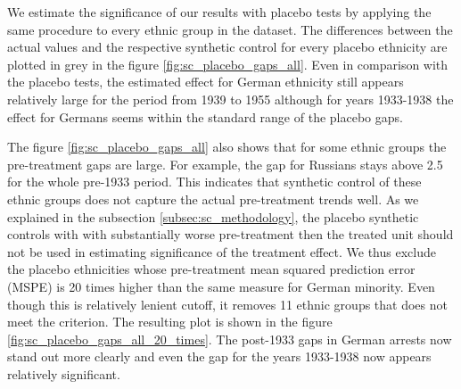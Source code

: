 We estimate the significance of our results with placebo tests by applying the same procedure to every ethnic group in the dataset. The differences between the actual values and the respective synthetic control for every placebo ethnicity are plotted in grey in the figure \ref{fig:sc_placebo_gaps_all}. Even in comparison with the placebo tests, 
the estimated effect for German ethnicity  still appears relatively large for the period from 1939 to 1955 although for years 1933-1938 the effect for Germans seems within the standard range of the placebo gaps.

The figure \ref{fig:sc_placebo_gaps_all} also shows that for some ethnic groups the pre-treatment gaps are large.
 For example, the gap for Russians stays above 2.5 for the whole pre-1933 period. 
 This indicates that synthetic control of these ethnic groups does not capture the actual pre-treatment trends well. 
 As we explained in the subsection \ref{subsec:sc_methodology}, the placebo synthetic controls  with with substantially  worse pre-treatment then the treated unit should not be 
used in estimating significance of the treatment effect. 
We thus  exclude the placebo ethnicities whose pre-treatment mean squared prediction error (MSPE) is 20 times higher than the same measure for German minority. Even though this is relatively lenient cutoff, it removes 11 ethnic groups that does not meet the criterion. 
The resulting plot is shown in the figure \ref{fig:sc_placebo_gaps_all_20_times}. The post-1933 gaps in German arrests now stand out more clearly and even the gap for the years 1933-1938 now appears relatively significant.  







